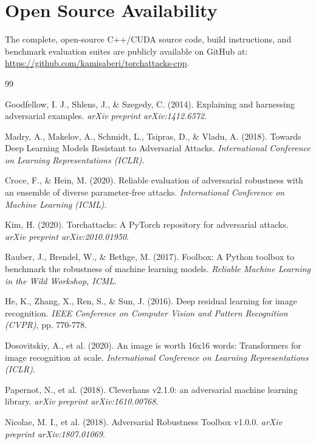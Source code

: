 \documentclass[11pt,onecolumn,a4paper]{article}
\begin{document}
\section*{Open Source Availability}
The complete, open-source C++/CUDA source code, build instructions, and benchmark evaluation suites are publicly available on GitHub at: \url{https://github.com/kamisaberi/torchattacks-cpp}.

\begin{thebibliography}{99}

Goodfellow, I. J., Shlens, J., \& Szegedy, C. (2014). Explaining and harnessing adversarial examples. \textit{arXiv preprint arXiv:1412.6572}.

Madry, A., Makelov, A., Schmidt, L., Tsipras, D., \& Vladu, A. (2018). Towards Deep Learning Models Resistant to Adversarial Attacks. \textit{International Conference on Learning Representations (ICLR)}.

Croce, F., \& Hein, M. (2020). Reliable evaluation of adversarial robustness with an ensemble of diverse parameter-free attacks. \textit{International Conference on Machine Learning (ICML)}.

Kim, H. (2020). Torchattacks: A PyTorch repository for adversarial attacks. \textit{arXiv preprint arXiv:2010.01950}.

Rauber, J., Brendel, W., \& Bethge, M. (2017). Foolbox: A Python toolbox to benchmark the robustness of machine learning models. \textit{Reliable Machine Learning in the Wild Workshop, ICML}.

He, K., Zhang, X., Ren, S., \& Sun, J. (2016). Deep residual learning for image recognition. \textit{IEEE Conference on Computer Vision and Pattern Recognition (CVPR)}, pp. 770-778.

Dosovitskiy, A., et al. (2020). An image is worth 16x16 words: Transformers for image recognition at scale. \textit{International Conference on Learning Representations (ICLR)}.

Papernot, N., et al. (2018). Cleverhans v2.1.0: an adversarial machine learning library. \textit{arXiv preprint arXiv:1610.00768}.

Nicolae, M. I., et al. (2018). Adversarial Robustness Toolbox v1.0.0. \textit{arXiv preprint arXiv:1807.01069}.

\end{thebibliography}
\end{document}
